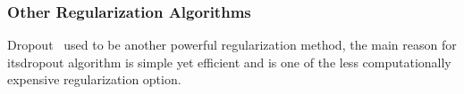 \subsubsection{Other Regularization Algorithms}

Dropout~\cite{JMLR:v15:srivastava14a} used to be another powerful regularization method, the main reason for itsdropout algorithm is simple yet efficient and is one of the less computationally expensive regularization option. 